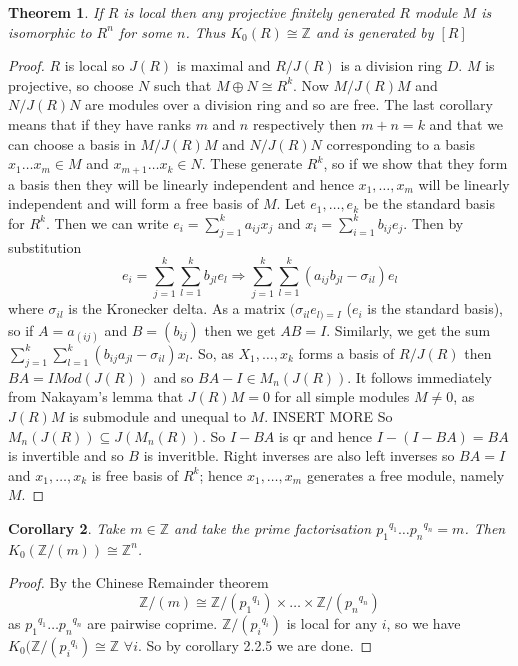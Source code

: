 \documentclass[a4paper,10pt]{article}
\newtheorem{thm}{Theorem}[subsection]
\newtheorem{cor}[thm]{Corollary}
\begin{document}
\begin{thm}
If $R$ is local then any projective finitely generated $R$ module $M$ is isomorphic to $R^{n}$ for some $n$. Thus $K_{0}(R)\cong \mathbb{Z}$ and is generated by $[R]$
\end{thm}
\begin{proof}
$R$ is local so $J(R)$ is maximal and $R/J(R)$ is a division ring $D$. $M$ is projective, so choose $N$ such that $M\oplus N\cong R^{k}$. Now $M/J(R)M$ and $N/J(R)N$ are modules over a division ring and so are free. The last corollary means that if they have ranks $m$ and $n$ respectively then $m+n=k$ and that we can choose a basis in $M/J(R)M$ and $N/J(R)N$ corresponding to a basis $x_{1}\ldots x_{m}\in M$ and $x_{m+1}\ldots x_{k}\in N$. These generate $R^{k}$, so if we show that they form a basis then they will be linearly independent and hence $x_{1},\ldots ,x_{m}$ will be linearly independent and will form a free basis of $M$.
\newline Let $e_{1},\ldots ,e_{k}$ be the standard basis for $R^{k}$. Then we can write $e_{i}=\sum_{j=1}^{k}a_{ij}x_{j}$ and $x_{i}=\sum_{i=1}^{k}b_{ij}e_{j}$. Then by substitution  $$e_{i}=\sum_{j=1}^{k}\sum_{l=1}^{k}b_{jl}e_{l} \Rightarrow \sum_{j=1}^{k}\sum_{l=1}^{k}(a_{ij}b_{jl}-\sigma_{il})e_{l}$$ where $\sigma_{il}$ is the Kronecker delta. As a matrix $(\sigma_{il}e_{l)=I}$ ($e_{i}$ is the standard basis), so if $A=a_(ij)$ and $B=(b_{ij})$ then we get $AB=I$.
\newline Similarly, we get the sum $\sum_{j=1}^{k}\sum_{l=1}^{k}(b_{ij}a_{jl}-\sigma_{il})x_{l}$. So, as $X_{1},\ldots ,x_{k}$ forms a basis of $R/J(R)$ then $BA=I Mod(J(R))$ and so $BA-I\in M_{n}(J(R))$. 
\newline It follows immediately from Nakayam's lemma that $J(R)M=0$ for all simple modules $M\neq 0$, as $J(R)M$ is submodule and unequal to $M$. INSERT MORE
So $M_{n}(J(R))\subseteq J(M_{n}(R))$. So $I-BA$ is qr and hence $I-(I-BA)=BA$ is invertible and so $B$ is inveritble. Right inverses are also left inverses so $BA=I$ and $x_{1},\ldots ,x_{k}$ is free basis of $R^{k}$; hence $x_{1},\ldots ,x_{m}$ generates a free module, namely $M$.
\end{proof}

\begin{cor}
Take $m\in \mathbb{Z}$ and take the prime factorisation ${p_{1}}^{q_{1}}\ldots {p_{n}}^{q_{n}}=m$. Then $K_{0}(\mathbb{Z}/(m))\cong \mathbb{Z}^{n}$.
\end{cor}
\begin{proof}
By the Chinese Remainder theorem $$\mathbb{Z}/(m)\cong \mathbb{Z}/({p_{1}}^{q_{1}})\times \ldots \times \mathbb{Z}/({p_{n}}^{q_{n}})$$ as ${p_{1}}^{q_{1}}\ldots {p_{n}}^{q_{n}}$ are pairwise coprime. $\mathbb{Z}/({p_{i}}^{q_{i}})$ is local for any $i$, so we have $K_{0}(\mathbb{Z}/({p_{i}}^{q_{i}})\cong \mathbb{Z}$ $\forall i$. So by corollary 2.2.5 we are done.
\end{proof}
\end{document}

